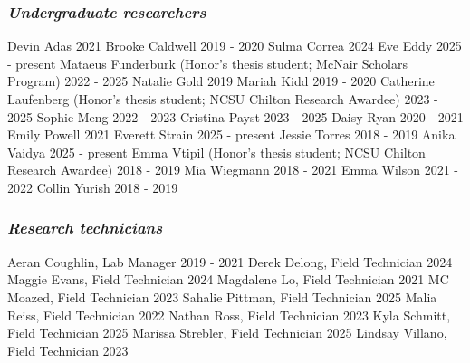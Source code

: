 \documentclass[11pt,english]{article}
\begin{document}
\subsubsection*{\emph{Undergraduate researchers}}
Devin Adas \hfill {2021} \newline
Brooke Caldwell \hfill {2019 - 2020} \newline
Sulma Correa \hfill {2024} \newline 
Eve Eddy \hfill {2025 - present} \newline 
Mataeus Funderburk (Honor's thesis student; McNair Scholars Program) \hfill {2022 - 2025} \newline
Natalie Gold \hfill {2019} \newline
Mariah Kidd \hfill {2019 - 2020} \newline
Catherine Laufenberg (Honor's thesis student; NCSU Chilton Research Awardee) \hfill {2023 - 2025} \newline 
Sophie Meng \hfill {2022 - 2023} \newline 
Cristina Payst \hfill {2023 - 2025} \newline 
Daisy Ryan \hfill {2020 - 2021} \newline 
Emily Powell \hfill {2021} \newline 
Everett Strain \hfill {2025 - present} \newline
Jessie Torres \hfill {2018 - 2019} \newline
Anika Vaidya \hfill {2025 - present} \newline
Emma Vtipil (Honor's thesis student; NCSU Chilton Research Awardee) \hfill {2018 - 2019} \newline
Mia Wiegmann \hfill {2018 - 2021} \newline 
Emma Wilson \hfill {2021 - 2022} \newline 
Collin Yurish \hfill {2018 - 2019} 

\subsubsection*{\emph{Research technicians}}
Aeran Coughlin, Lab Manager \hfill {2019 - 2021} \newline
Derek Delong, Field Technician \hfill {2024} \newline
Maggie Evans, Field Technician \hfill {2024} \newline
Magdalene Lo, Field Technician \hfill {2021} \newline
MC Moazed, Field Technician \hfill {2023} \newline
Sahalie Pittman, Field Technician \hfill {2025} \newline
Malia Reiss, Field Technician \hfill {2022} \newline
Nathan Ross, Field Technician \hfill {2023} \newline
Kyla Schmitt, Field Technician \hfill {2025} \newline
Marissa Strebler, Field Technician \hfill {2025} \newline
Lindsay Villano, Field Technician \hfill {2023}
\end{document}
